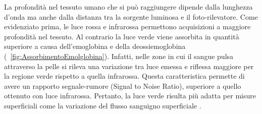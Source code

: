 La profondità nel tessuto umano che si può raggiungere dipende dalla lunghezza d'onda ma anche dalla distanza tra la sorgente luminosa e il foto-rilevatore. Come evidenziato prima, le luce rossa e infrarossa permettono acquisizioni a maggiore profondità nel tessuto. Al contrario la luce verde viene assorbita in quantità superiore\cite{Lee2021} a causa dell'emoglobina e della deossiemoglobina (\Fig~\ref{fig:AssorbimentoEmolglobina}). Infatti, nelle zone in cui il sangue pulsa attraverso la pelle si rileva una variazione tra luce emessa e riflessa maggiore per la regione verde rispetto a quella infrarossa. Questa caratteristica permette di avere un rapporto segnale-rumore (Signal to Noise Ratio), superiore a quello ottenuto con luce infrarossa. Pertanto, la luce verde risulta più adatta per misure superficiali come la variazione del flusso sanguigno superficiale \cite{Youssef2020}.

